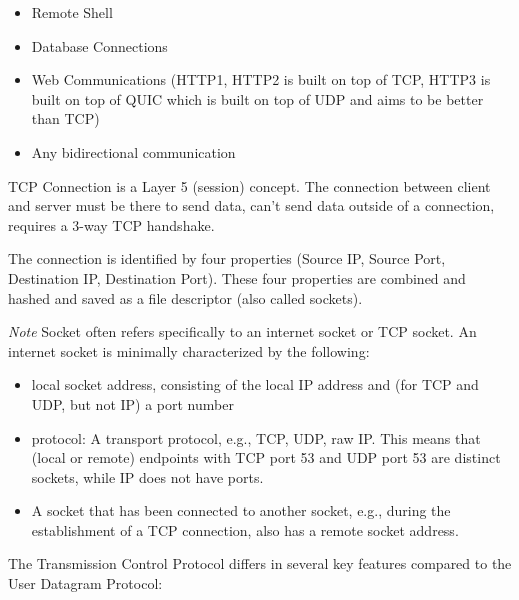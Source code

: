 \documentclass{article}
\begin{document}
\begin{itemize}
    \item Remote Shell
    \item Database Connections
    \item Web Communications (HTTP1, HTTP2 is built on top of TCP, HTTP3 is built on top of QUIC which is built on top of UDP and aims to be better than TCP)
    \item Any bidirectional communication
\end{itemize}

TCP Connection is a Layer 5 (session) concept. The connection between client and server must be there to send data, can't send data outside of a connection, requires a 3-way TCP handshake.

The connection is identified by four properties (Source IP, Source Port, Destination IP, Destination Port). These four properties are combined and hashed and saved as a file descriptor (also called sockets).

\textit{Note} Socket often refers specifically to an internet socket or TCP socket. An internet socket is minimally characterized by the following:

\begin{itemize}
    \item local socket address, consisting of the local IP address and (for TCP and UDP, but not IP) a port number
    \item protocol: A transport protocol, e.g., TCP, UDP, raw IP. This means that (local or remote) endpoints with TCP port 53 and UDP port 53 are distinct sockets, while IP does not have ports.
    \item A socket that has been connected to another socket, e.g., during the establishment of a TCP connection, also has a remote socket address.
\end{itemize}

The Transmission Control Protocol differs in several key features compared to the User Datagram Protocol:
\end{document}
